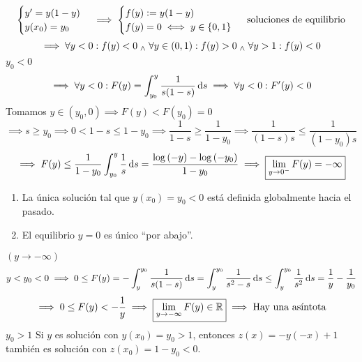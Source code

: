 \begin{ejem}
	\[\begin{cases}
		y'=y(1-y) \\
		y(x_0)=y_0
	\end{cases} \implies \begin{cases} 
		f(y)\vcentcolon= y(1-y) \\
		f(y) = 0 \iff y \in \{0, 1\} 
	\end{cases} \text{ soluciones de equilibrio}\]
	\[\implies \forall y < 0 :f(y) < 0 \; _{\wedge} \; \forall y \in (0, 1) : f(y) > 0 \; _{\wedge} \; \forall y > 1 : f(y) < 0\]
	$\boxed{y_0 < 0}$
	\[\implies \forall y < 0 : F(y)=\int_{y_0}^{y}\frac{1}{s(1-s)}\odif{s} \implies \forall y<0 : F'(y)<0\]
	Tomamos $y\in (y_0, 0) \implies F(y)<F(y_0)=0$
	\[\implies s \geq y_0 \implies 0<1-s \leq 1-y_0 \implies \frac{1}{1-s}\geq\frac{1}{1-y_0} \implies \frac{1}{(1-s)s}\leq \frac{1}{(1-y_0)s}\]
	\[\implies F(y) \leq \frac{1}{1-y_0}\int_{y_0}^{y} \frac{1}{s} \odif{s} = \frac{\log{(-y)} - \log{(-y_0)}}{1-y_0} \implies \boxed{\lim_{y\to0^-} F(y) = -\infty}\]
	\begin{enumerate}
		\item La única solución tal que $y(x_0)=y_0<0$ está definida globalmente hacia el pasado.
		\item El equilibrio $y=0$ es único ``por abajo''.
	\end{enumerate}
	$(y\to-\infty)$
	\[y<y_0<0 \implies 0 \leq F(y)=-\int_{y}^{y_0} \frac{1}{s(1-s)} \odif{s} = \int_{y}^{y_0} \frac{1}{s^2-s} \odif{s} \leq \int_{y}^{y_0} \frac{1}{s^2} \odif{s} = \frac{1}{y} -\frac{1}{y_0}\]
	\[\implies 0\leq F(y) < -\frac{1}{y} \implies \boxed{\lim_{y\to -\infty} F(y) \in \mathbb{R}} \implies \text{Hay una asíntota}\]
	$\boxed{y_0>1}$ Si $y$ es solución con $y(x_0)=y_0>1$, entonces $z(x)=-y(-x)+1$ también es solución con $z(x_0)=1-y_0<0$.
\end{ejem}


 